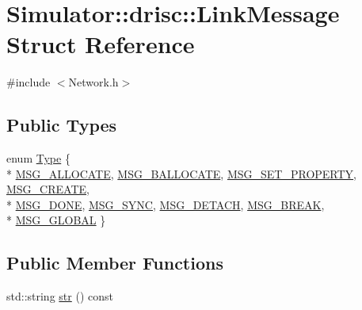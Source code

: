 \hypertarget{struct_simulator_1_1drisc_1_1_link_message}{\section{Simulator\+:\+:drisc\+:\+:Link\+Message Struct Reference}
\label{struct_simulator_1_1drisc_1_1_link_message}
}


{\ttfamily \#include $<$Network.\+h$>$}

\subsection*{Public Types}
\begin{DoxyCompactItemize}
\item 
enum \hyperlink{struct_simulator_1_1drisc_1_1_link_message_a96329a62ee5cf3fb1fc5ae96076a63f8}{Type} \{ \\*
\hyperlink{struct_simulator_1_1drisc_1_1_link_message_a96329a62ee5cf3fb1fc5ae96076a63f8af2894706709cda7895e7ede7c4088a0e}{M\+S\+G\+\_\+\+A\+L\+L\+O\+C\+A\+T\+E}, 
\hyperlink{struct_simulator_1_1drisc_1_1_link_message_a96329a62ee5cf3fb1fc5ae96076a63f8aba37866ab99a42b26031c3a0e1cd5683}{M\+S\+G\+\_\+\+B\+A\+L\+L\+O\+C\+A\+T\+E}, 
\hyperlink{struct_simulator_1_1drisc_1_1_link_message_a96329a62ee5cf3fb1fc5ae96076a63f8a3e29e02199c93bafc9fe56099f8a7227}{M\+S\+G\+\_\+\+S\+E\+T\+\_\+\+P\+R\+O\+P\+E\+R\+T\+Y}, 
\hyperlink{struct_simulator_1_1drisc_1_1_link_message_a96329a62ee5cf3fb1fc5ae96076a63f8a37e1d16ca46ea206d1e20c9db4fff0b0}{M\+S\+G\+\_\+\+C\+R\+E\+A\+T\+E}, 
\\*
\hyperlink{struct_simulator_1_1drisc_1_1_link_message_a96329a62ee5cf3fb1fc5ae96076a63f8a2a3f9e7516ed56c26f2af82a7d053c3c}{M\+S\+G\+\_\+\+D\+O\+N\+E}, 
\hyperlink{struct_simulator_1_1drisc_1_1_link_message_a96329a62ee5cf3fb1fc5ae96076a63f8a38fb6d31797672a80bea85111f910d14}{M\+S\+G\+\_\+\+S\+Y\+N\+C}, 
\hyperlink{struct_simulator_1_1drisc_1_1_link_message_a96329a62ee5cf3fb1fc5ae96076a63f8a9aac2f483e41b85f60a6297af5d48c2e}{M\+S\+G\+\_\+\+D\+E\+T\+A\+C\+H}, 
\hyperlink{struct_simulator_1_1drisc_1_1_link_message_a96329a62ee5cf3fb1fc5ae96076a63f8a81571060904d8557a60a14dbad10a4dc}{M\+S\+G\+\_\+\+B\+R\+E\+A\+K}, 
\\*
\hyperlink{struct_simulator_1_1drisc_1_1_link_message_a96329a62ee5cf3fb1fc5ae96076a63f8ac6df5d749217838a133540a2db114027}{M\+S\+G\+\_\+\+G\+L\+O\+B\+A\+L}
 \}
\end{DoxyCompactItemize}
\subsection*{Public Member Functions}
\begin{DoxyCompactItemize}
\item 
std\+::string \hyperlink{struct_simulator_1_1drisc_1_1_link_message_a44068a2729c7dd0fee0692e9d6116dfc}{str} () const 
\end{DoxyCompactItemize}
